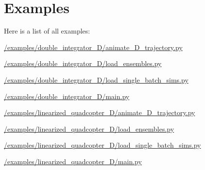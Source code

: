 \section{Examples}
Here is a list of all examples\+:\begin{DoxyCompactItemize}
\item 
\mbox{\hyperlink{_2examples_2double_integrator_3_d_2animate_3_d_trajectory_8py-example}{/examples/double\+\_\+integrator\+\_\+D/animate\+\_\+D\+\_\+trajectory.\+py}}
\item 
\mbox{\hyperlink{_2examples_2double_integrator_3_d_2load_ensembles_8py-example}{/examples/double\+\_\+integrator\+\_\+D/load\+\_\+ensembles.\+py}}
\item 
\mbox{\hyperlink{_2examples_2double_integrator_3_d_2load_single_batch_sims_8py-example}{/examples/double\+\_\+integrator\+\_\+D/load\+\_\+single\+\_\+batch\+\_\+sims.\+py}}
\item 
\mbox{\hyperlink{_2examples_2double_integrator_3_d_2main_8py-example}{/examples/double\+\_\+integrator\+\_\+D/main.\+py}}
\item 
\mbox{\hyperlink{_2examples_2linearized_quadcopter_3_d_2animate_3_d_trajectory_8py-example}{/examples/linearized\+\_\+quadcopter\+\_\+D/animate\+\_\+D\+\_\+trajectory.\+py}}
\item 
\mbox{\hyperlink{_2examples_2linearized_quadcopter_3_d_2load_ensembles_8py-example}{/examples/linearized\+\_\+quadcopter\+\_\+D/load\+\_\+ensembles.\+py}}
\item 
\mbox{\hyperlink{_2examples_2linearized_quadcopter_3_d_2load_single_batch_sims_8py-example}{/examples/linearized\+\_\+quadcopter\+\_\+D/load\+\_\+single\+\_\+batch\+\_\+sims.\+py}}
\item 
\mbox{\hyperlink{_2examples_2linearized_quadcopter_3_d_2main_8py-example}{/examples/linearized\+\_\+quadcopter\+\_\+D/main.\+py}}
\end{DoxyCompactItemize}
